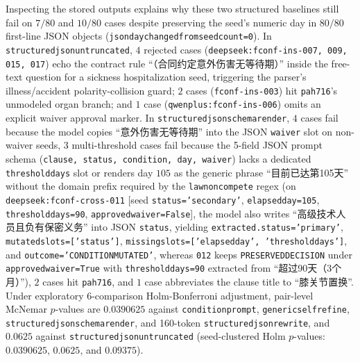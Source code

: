 \documentclass[10pt,twocolumn]{article}
\renewcommand{\_}{\textunderscore\allowbreak}
\begin{document}
\begin{enumerate}[leftmargin=*,nosep]
  Inspecting the stored outputs explains why these two structured baselines still fail on $7/80$ and $10/80$ cases despite preserving the seed's numeric day in $80/80$ first-line JSON objects (\texttt{json\_day\_changed\_from\_seed\_count=0}). In \texttt{structured\_json\_untruncated\_320}, $4$ rejected cases (\texttt{deepseek:fconf-ins-007, 009, 015, 017}) echo the contract rule ``（合同约定意外伤害无等待期）'' inside the free-text question for a sickness hospitalization seed, triggering the parser's illness/accident polarity-collision guard; $2$ cases (\texttt{fconf-ins-003}) hit \texttt{pa\_h716}'s unmodeled organ branch; and $1$ case (\texttt{qwen\_plus:fconf-ins-006}) omits an explicit waiver approval marker. In \texttt{structured\_json\_schema\_render}, $4$ cases fail because the model copies ``意外伤害无等待期'' into the JSON \texttt{waiver} slot on non-waiver seeds, $3$ multi-threshold cases fail because the 5-field JSON prompt schema (\texttt{clause, status, condition, day, waiver}) lacks a dedicated \texttt{threshold\_days} slot or renders day $105$ as the generic phrase ``目前已达第105天'' without the domain prefix required by the \texttt{law\_noncompete} regex (on \texttt{deepseek:fconf-cross-011} [seed \texttt{status='secondary'}, \texttt{elapsed\_day=105}, \allowbreak \texttt{threshold\_days=90}, \allowbreak \texttt{approved\_waiver=False}], the model also writes ``高级技术人员且负有保密义务'' into JSON \texttt{status}, yielding \texttt{extracted.status='primary'}, \texttt{mutated\_slots=['status']}, \texttt{missing\_slots=['elapsed\_day', 'threshold\_days']}, and \texttt{outcome='CONDITION\_MUTATED'}, whereas \texttt{012} keeps \texttt{PRESERVED\_DECISION} under \texttt{approved\_waiver=True} with \texttt{threshold\_days=90} extracted from ``超过90天（3个月）''), $2$ cases hit \texttt{pa\_h716}, and $1$ case abbreviates the clause title to ``膝关节置换''. Under exploratory 6-comparison Holm-Bonferroni adjustment, pair-level McNemar $p$-values are $0.0390625$ against \texttt{condition\_prompt}, \texttt{generic\_self\_refine}, \texttt{structured\_json\_schema\_render}, and 160-token \texttt{structured\_json\_rewrite}, and $0.0625$ against \texttt{structured\_json\_untruncated\_320} (seed-clustered Holm $p$-values: $0.0390625$, $0.0625$, and $0.09375$).

\end{enumerate}
\end{document}
